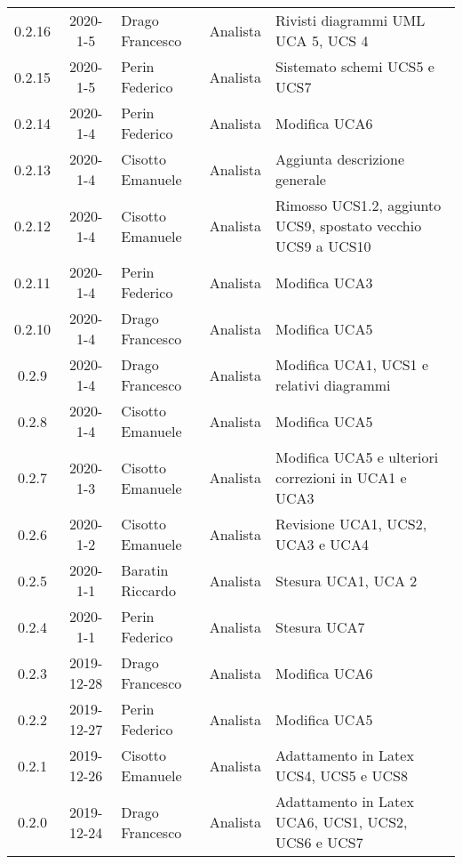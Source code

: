 {\begin{longtable}{ c c  C{4cm}  C{3cm} C{4cm}}
0.2.16 & 2020-1-5 & Drago Francesco & Analista & Rivisti diagrammi UML UCA 5, UCS 4 \\

0.2.15 & 2020-1-5 & Perin Federico & Analista & Sistemato schemi UCS5 e UCS7 \\

0.2.14 & 2020-1-4 & Perin Federico & Analista & Modifica UCA6 \\

0.2.13 & 2020-1-4 & Cisotto Emanuele & Analista & Aggiunta descrizione generale \\

0.2.12 & 2020-1-4 & Cisotto Emanuele & Analista & Rimosso UCS1.2, aggiunto UCS9, spostato vecchio UCS9 a UCS10 \\

0.2.11 & 2020-1-4 & Perin Federico & Analista & Modifica UCA3 \\

0.2.10 & 2020-1-4 & Drago Francesco & Analista & Modifica UCA5 \\

0.2.9 & 2020-1-4 & Drago Francesco & Analista & Modifica UCA1, UCS1 e relativi diagrammi \\

0.2.8 & 2020-1-4 & Cisotto Emanuele & Analista & Modifica UCA5 \\

0.2.7 & 2020-1-3 & Cisotto Emanuele & Analista & Modifica UCA5 e ulteriori correzioni in UCA1 e UCA3 \\

0.2.6 & 2020-1-2 & Cisotto Emanuele & Analista & Revisione UCA1, UCS2, UCA3 e UCA4 \\

0.2.5 & 2020-1-1 & Baratin Riccardo & Analista & Stesura UCA1, UCA 2 \\

0.2.4 & 2020-1-1 & Perin Federico & Analista & Stesura UCA7 \\

0.2.3 & 2019-12-28 & Drago Francesco & Analista & Modifica UCA6 \\

0.2.2 & 2019-12-27 & Perin Federico & Analista & Modifica UCA5 \\

0.2.1 & 2019-12-26 & Cisotto Emanuele & Analista & Adattamento in Latex UCS4, UCS5 e UCS8 \\

0.2.0 & 2019-12-24 & Drago Francesco & Analista & Adattamento in Latex UCA6, UCS1, UCS2, UCS6 e UCS7 \\


\end{longtable}}
